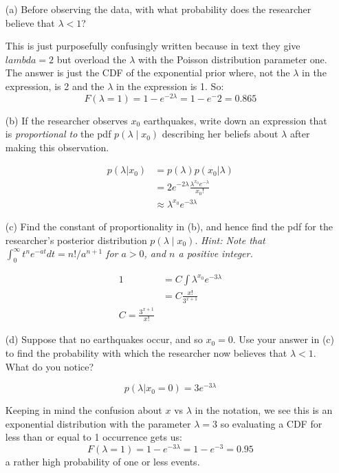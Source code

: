 \documentclass{article}
\newcommand{\1}{\mathbf{1}}
\begin{document}
\begin{enumerate}
    \item[(a)] Before observing the data, with what probability does the researcher believe that $\lambda < 1$? 
    
    This is just purposefully confusingly written because in text they give $lambda = 2$ but overload the $\lambda$ with the Poisson distribution parameter one. The answer is just the CDF of the exponential prior where, not the $\lambda$ in the expression, is 2 and the $\lambda$ in the expression is 1. So:
    $$F(\lambda=1) = 1 - e^{-2\lambda} = 1 - e^-2 = 0.865$$

    \item[(b)] If the researcher observes $x_0$ earthquakes, write down an expression that is {\it proportional to} the pdf $p(\lambda \mid x_0)$ describing her beliefs about $\lambda$ after making this observation.
    
    \begin{align*}
        p(\lambda |x_0) &= p(\lambda)p(x_0|\lambda) \\
        &= 2 e^{-2\lambda} \frac{\lambda^{x_0}e^{-\lambda}}{x_0!} \\
        &\approx \lambda^{x_0} e^{-3\lambda}
    \end{align*}

    \item[(c)] Find the constant of proportionality in (b), and hence find the pdf for the researcher's posterior distribution $p(\lambda \mid x_0)$.
    {\it Hint: Note that $\int_{0}^{\infty} t^n e^{-at}dt = n!/a^{n+1}$ for $a>0$, and $n$ a positive integer.}
        
    \begin{align*}
        1 &= C \int \lambda^{x_0} e^{-3\lambda} \\
        &= C \frac{x!}{3^{x+1}} \\
        C = \frac{3^{x+1}}{x!}
    \end{align*}
    
    \item[(d)] Suppose that no earthquakes occur, and so $x_0=0$. Use your answer in (c) to find the probability with which the researcher now believes that $\lambda < 1$. What do you notice?
    
    $$p(\lambda | x_0 = 0) = 3 e^{-3\lambda}$$
    
    Keeping in mind the confusion about $x$ vs $\lambda$ in the notation, we see this is an exponential distribution with the parameter $\lambda=3$ so evaluating a CDF for less than or equal to 1 occurrence gets us:
    $$F(\lambda=1) = 1 - e^{-3\lambda} = 1 - e^{-3} = 0.95$$
    a rather high probability of one or less events.
\end{enumerate}
\end{document}
